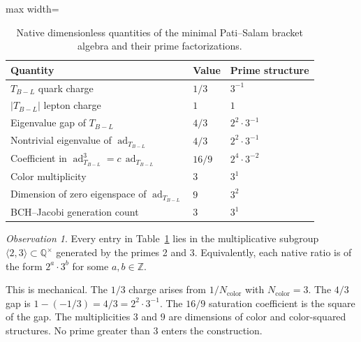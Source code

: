 \documentclass[11pt]{article}
\theoremstyle{plain}
\theoremstyle{remark}
\newtheorem*{observation}{Observation}
\newcommand{\TBL}{T_{B\!-\!L}}
\newcommand{\ad}{\operatorname{ad}}
\begin{document}
\begin{table}[h]
\centering
\small
\begin{adjustbox}{max width=\linewidth}\begin{tabular}{lll}
\toprule
Quantity & Value & Prime structure \\
\midrule
$\TBL$ quark charge & $1/3$ & $3^{-1}$ \\
$|\TBL|$ lepton charge & $1$ & $1$ \\
Eigenvalue gap of $\TBL$ & $4/3$ & $2^2 \cdot 3^{-1}$ \\
Nontrivial eigenvalue of $\ad_{\TBL}$ & $4/3$ & $2^2 \cdot 3^{-1}$ \\
Coefficient in $\ad_{\TBL}^3 = c \, \ad_{\TBL}$ & $16/9$ & $2^4 \cdot 3^{-2}$ \\
Color multiplicity & $3$ & $3^1$ \\
Dimension of zero eigenspace of $\ad_{\TBL}$ & $9$ & $3^2$ \\
BCH--Jacobi generation count & $3$ & $3^1$ \\
\bottomrule
\end{tabular}\end{adjustbox}
\caption{Native dimensionless quantities of the minimal Pati--Salam
bracket algebra and their prime factorizations.}
\label{tab:ps-ratios}
\end{table}

\begin{observation}
\label{obs:lattice}
Every entry in Table~\ref{tab:ps-ratios} lies in the multiplicative
subgroup $\langle 2, 3 \rangle \subset \mathbb{Q}^\times$ generated
by the primes 2 and 3.  Equivalently, each native ratio is of the
form $2^a \cdot 3^b$ for some $a, b \in \mathbb{Z}$.
\end{observation}

This is mechanical.  The $1/3$ charge arises from $1/N_{\mathrm{color}}$
with $N_{\mathrm{color}} = 3$.  The $4/3$ gap is $1 - (-1/3) = 4/3 =
2^2 \cdot 3^{-1}$.  The $16/9$ saturation coefficient is the square
of the gap.  The multiplicities $3$ and $9$ are dimensions of color
and color-squared structures.  No prime greater than $3$ enters the
construction.
\end{document}
